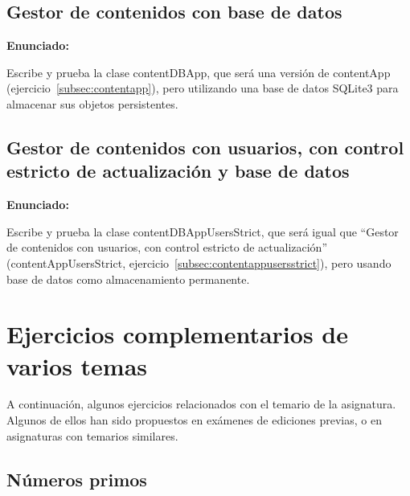 {\subsection{Gestor de contenidos con base de datos}
\label{subsec:gestor-contenidos-bbdd}

\textbf{Enunciado:}

Escribe y prueba la clase contentDBApp, que será una versión de contentApp (ejercicio~\ref{subsec:contentapp}), pero utilizando una base de datos SQLite3 para almacenar sus objetos persistentes.

\subsection{Gestor de contenidos con usuarios, con control estricto de actualización y base de datos}
\label{subsec:gestor-contenidos-usuarios-bbdd}

\textbf{Enunciado:}

Escribe y prueba la clase contentDBAppUsersStrict, que será igual que ``Gestor de contenidos con usuarios, con control estricto de actualización'' (contentAppUsersStrict, ejercicio~\ref{subsec:contentappusersstrict}), pero usando base de datos como almacenamiento permanente.

\newpage




\section{Ejercicios complementarios de varios temas}

A continuación, algunos ejercicios relacionados con el temario de la asignatura. Algunos de ellos han sido propuestos en exámenes de ediciones previas, o en asignaturas con temarios similares.

\subsection{Números primos}

}

